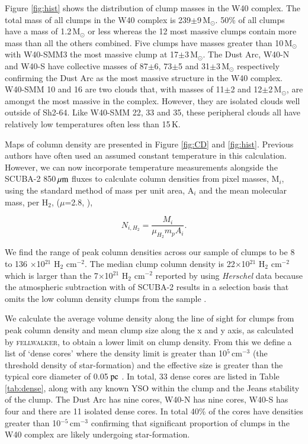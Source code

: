 Figure \ref{fig:hist} shows the distribution of clump masses in the W40 complex. The total mass of 
all clumps in the W40 complex is 239$\pm$9\,M$_{\odot}$. 50\% of all clumps have a mass of 
1.2\,M$_{\odot}$ or less whereas the 12 most massive clumps contain more mass than all the 
others combined. Five clumps have masses greater than 10\,M$_{\odot}$ with W40-SMM3 the 
most massive clump at 17$\pm$3\,M$_{\odot}$. The Dust Arc, W40-N and W40-S have collective 
masses of 87$\pm$6, 73$\pm$5 and 31$\pm$3\,M$_{\odot}$ respectively confirming the Dust Arc 
as the most massive structure in the W40 complex. W40-SMM 10 and 16 are two clouds that, with 
masses of 11$\pm$2 and 12$\pm$2\,M$_{\odot}$, are amongst the most massive in the complex. 
However, they are isolated clouds well outside of Sh2-64. Like W40-SMM 22, 33 and 35, these 
peripheral clouds all have relatively low temperatures often less than 15\,K.

Maps of column density are presented in Figure \ref{fig:CD} and \ref{fig:hist}. Previous authors 
\citep{Johnstone:2000fk,Sadavoy:2010ve} have often used an assumed constant temperature 
in this calculation. However, we can now incorporate temperature measurements alongside 
the SCUBA-2 850$\,\mu\rm{m}$ fluxes to calculate column densities from pixel masses, M$_{i}$, 
using the standard method of mass per unit area, A$_{i}$ and the mean molecular mass, per 
H$_{2}$, ($\mu$=2.8, \citeauthor{kauffmann08} \citeyear{kauffmann08}), 

\begin{equation}
N_{i,H_{2}}=\frac{M_{i}}{\mu _{H_{2}}m_{p}A_{i}}.
\label{eqn:CD}
\end{equation}

We find the range of peak column densities across our sample of clumps to be 8 to 136 
$\times$10$^{21}$ H$_{\mathrm{2}}$ cm$^{-2}$. The median clump column density is 
22$\times$10$^{21}$ H$_{\mathrm{2}}$ cm$^{-2}$ which is larger than the 7$\times$10$^{21}$ 
H$_{\mathrm{2}}$ cm$^{-2}$ reported by \cite{Konyves:2015uq} using \emph{Herschel} data 
because the atmospheric subtraction with of SCUBA-2 results in a selection basis that omits 
the low column density clumps from the sample \citep{Ward-Thompson:2015fk}. 

We calculate the average volume density along the line of sight for clumps from peak column 
density and mean clump size along the x and y axis, as calculated by \textsc{fellwalker}, to obtain 
a lower limit on clump density. From this we define a list of `dense cores' where the density limit is 
greater than 10$^{5}$\,cm$^{-3}$ (the threshold density of star-formation) and the effective size is 
greater than the typical core diameter of 0.05$\hbox{ pc}$ \citep{Rygl:2013ve}. In total, 33 dense 
cores are listed in Table \ref{tab:dense}, along with any known YSO within the clump and the Jeans 
stability of the clump. The Dust Arc has nine cores, W40-N has nine cores, W40-S has four and there 
are 11 isolated dense cores. In total 40\% of the cores have densities greater than 10$^{-5}$\,cm$^{-3}$ 
confirming that significant proportion of clumps in the W40 complex are likely undergoing star-formation.

